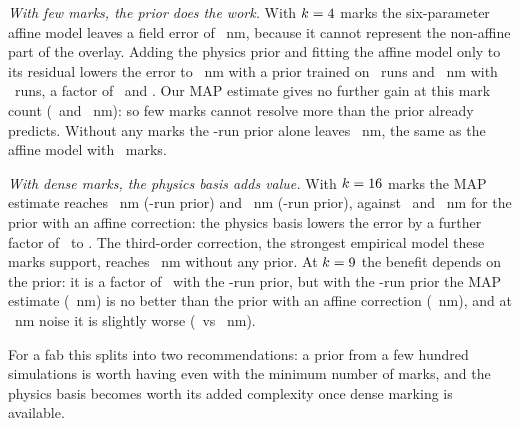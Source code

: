 \documentclass[11pt]{article}
\begin{document}
\emph{With few marks, the prior does the work.} With $k=4$ marks the six-parameter affine model leaves a field
error of \EtwoAffineFour~nm, because it cannot represent the non-affine part of the overlay. Adding the physics prior and
fitting the affine model only to its residual lowers the error to \EtwoPriorAffineFour~nm with a prior trained on
\EtwoPriorLarge~runs and \EtwoPriorAffineFourSmallPrior~nm with \EtwoPriorSmall~runs, a factor of
\EtwoPriorGainFourLarge~and \EtwoPriorGainFourSmall. Our MAP estimate gives no further gain at this mark count
(\EtwoOursFour~and \EtwoOursFourSmallPrior~nm): so few marks cannot resolve more than the prior already predicts. Without
any marks the \EtwoPriorLarge-run prior alone leaves \EtwoPriorOnly~nm, the same as the affine model with
\EtwoKFour~marks.

\emph{With dense marks, the physics basis adds value.} With $k=16$ marks the MAP estimate reaches
\EtwoOursSixteen~nm (\EtwoPriorLarge-run prior) and \EtwoOursSixteenSmallPrior~nm (\EtwoPriorSmall-run prior), against
\EtwoPriorAffineSixteen~and \EtwoPriorAffineSixteenSmallPrior~nm for the prior with an affine correction: the physics
basis lowers the error by a further factor of \EtwoBasisGainSixteenLarge~to \EtwoBasisGainSixteenSmall. The
third-order correction, the strongest empirical model these marks support, reaches \EtwoPolyThreeSixteen~nm without any
prior. At $k=9$ the benefit depends on the prior: it is a factor of \EtwoBasisGainNineSmall~with the
\EtwoPriorSmall-run prior, but with the \EtwoPriorLarge-run prior the MAP estimate (\EtwoOursNine~nm) is no better than
the prior with an affine correction (\EtwoPriorAffineNine~nm), and at \EtwoNoiseHigh~nm noise it is slightly worse
(\EtwoOursNineNoiseHigh~vs \EtwoPriorAffineNineNoiseHigh~nm).

For a fab this splits into two recommendations: a prior from a few hundred simulations is worth having even with the
minimum number of marks, and the physics basis becomes worth its added complexity once dense marking is available.
\end{document}
